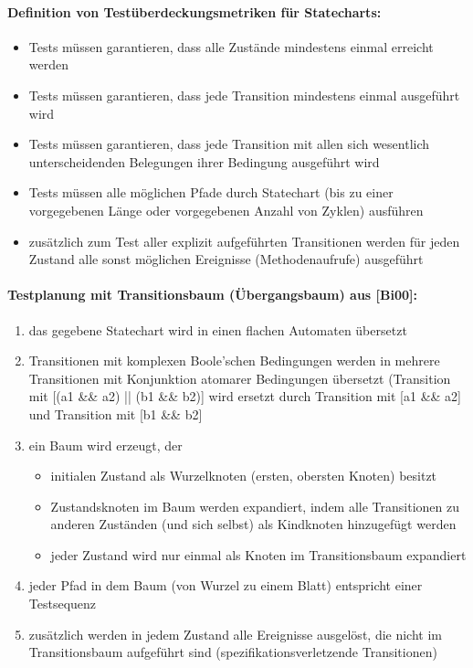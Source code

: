 \paragraph{Definition von Testüberdeckungsmetriken für Statecharts:}
\begin{itemize}
	\item Tests müssen garantieren, dass alle Zustände mindestens einmal erreicht werden
	\item Tests müssen garantieren, dass jede Transition mindestens einmal ausgeführt wird
	\item Tests müssen garantieren, dass jede Transition mit allen sich wesentlich unterscheidenden Belegungen ihrer Bedingung ausgeführt wird
	\item Tests müssen alle möglichen Pfade durch Statechart (bis zu einer vorgegebenen Länge oder vorgegebenen Anzahl von Zyklen) ausführen
	\item zusätzlich zum Test aller explizit aufgeführten Transitionen werden für jeden Zustand alle sonst möglichen Ereignisse (Methodenaufrufe) ausgeführt 
\end{itemize}

\paragraph{Testplanung mit Transitionsbaum (Übergangsbaum) aus [Bi00]:}
\begin{enumerate}
	\item das gegebene Statechart wird in einen flachen Automaten übersetzt
	\item Transitionen mit komplexen Boole’schen Bedingungen werden in mehrere Transitionen mit Konjunktion atomarer Bedingungen übersetzt (Transition mit [(a1 \&\& a2) || (b1 \&\& b2)] wird ersetzt durch Transition mit [a1 \&\& a2] und Transition mit [b1 \&\& b2]
	\item ein Baum wird erzeugt, der
	\begin{itemize}
		\item initialen Zustand als Wurzelknoten (ersten, obersten Knoten) besitzt
		\item Zustandsknoten im Baum werden expandiert, indem alle Transitionen zu anderen Zuständen (und sich selbst) als Kindknoten hinzugefügt werden
		\item jeder Zustand wird nur einmal als Knoten im Transitionsbaum expandiert
	\end{itemize}
	\item jeder Pfad in dem Baum (von Wurzel zu einem Blatt) entspricht einer Testsequenz
	\item zusätzlich werden in jedem Zustand alle Ereignisse ausgelöst, die nicht im Transitionsbaum aufgeführt sind (spezifikationsverletzende Transitionen)
\end{enumerate}


